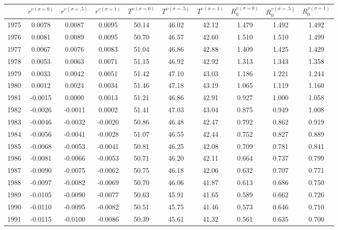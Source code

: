 \begin{tabular}{cccccccccc}
  \hline
 & $r^{\upsilon (\sigma = 0)}$ & $r^{\upsilon (\sigma = .5)}$ & $r^{\upsilon (\sigma = 1)}$ & $T^{\upsilon (\sigma = 0)}$ & $T^{\upsilon (\sigma = .5)}$ & $T^{\upsilon (\sigma = 1)}$ & $R_0^{\upsilon (\sigma = 0)}$ & $R_0^{\upsilon (\sigma = .5)}$ & $R_0^{\upsilon (\sigma = 1)}$ \\ 
  \hline
1975 & 0.0078 & 0.0087 & 0.0095 & 50.14 & 46.02 & 42.12 & 1.479 & 1.492 & 1.492 \\ 
  1976 & 0.0081 & 0.0089 & 0.0095 & 50.70 & 46.57 & 42.60 & 1.510 & 1.510 & 1.499 \\ 
  1977 & 0.0067 & 0.0076 & 0.0083 & 51.04 & 46.86 & 42.88 & 1.409 & 1.425 & 1.429 \\ 
  1978 & 0.0053 & 0.0063 & 0.0071 & 51.15 & 46.92 & 42.92 & 1.313 & 1.343 & 1.358 \\ 
  1979 & 0.0033 & 0.0042 & 0.0051 & 51.42 & 47.10 & 43.03 & 1.186 & 1.221 & 1.244 \\ 
  1980 & 0.0012 & 0.0024 & 0.0034 & 51.46 & 47.18 & 43.19 & 1.065 & 1.119 & 1.160 \\ 
  1981 & -0.0015 & 0.0000 & 0.0013 & 51.21 & 46.86 & 42.91 & 0.927 & 1.000 & 1.058 \\ 
  1982 & -0.0026 & -0.0011 & 0.0002 & 51.41 & 47.03 & 43.04 & 0.875 & 0.949 & 1.008 \\ 
  1983 & -0.0046 & -0.0032 & -0.0020 & 50.86 & 46.48 & 42.47 & 0.792 & 0.862 & 0.919 \\ 
  1984 & -0.0056 & -0.0041 & -0.0028 & 51.07 & 46.55 & 42.44 & 0.752 & 0.827 & 0.889 \\ 
  1985 & -0.0068 & -0.0053 & -0.0041 & 50.81 & 46.25 & 42.08 & 0.709 & 0.781 & 0.841 \\ 
  1986 & -0.0081 & -0.0066 & -0.0053 & 50.71 & 46.20 & 42.11 & 0.664 & 0.737 & 0.799 \\ 
  1987 & -0.0090 & -0.0075 & -0.0062 & 50.75 & 46.18 & 42.06 & 0.632 & 0.707 & 0.771 \\ 
  1988 & -0.0097 & -0.0082 & -0.0069 & 50.70 & 46.06 & 41.87 & 0.613 & 0.686 & 0.750 \\ 
  1989 & -0.0105 & -0.0090 & -0.0077 & 50.63 & 45.91 & 41.65 & 0.589 & 0.662 & 0.726 \\ 
  1990 & -0.0110 & -0.0095 & -0.0082 & 50.51 & 45.75 & 41.46 & 0.573 & 0.646 & 0.710 \\ 
  1991 & -0.0115 & -0.0100 & -0.0086 & 50.39 & 45.61 & 41.32 & 0.561 & 0.635 & 0.700 \\ 

\end{tabular}
